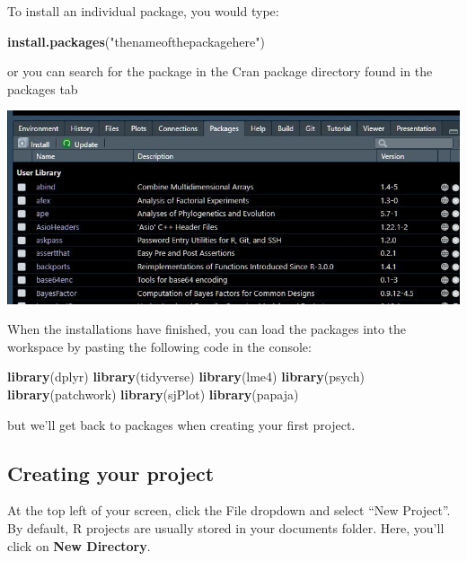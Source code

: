 \documentclass[
]{html}
\newenvironment{Shaded}{\begin{snugshade}}{\end{snugshade}}
\newcommand{\FunctionTok}[1]{\textcolor[rgb]{0.13,0.29,0.53}{\textbf{#1}}}
\newcommand{\NormalTok}[1]{#1}
\newcommand{\StringTok}[1]{\textcolor[rgb]{0.31,0.60,0.02}{#1}}
\theoremstyle{definition}
\theoremstyle{definition}
\theoremstyle{definition}
\theoremstyle{definition}
\theoremstyle{remark}
\begin{document}
To install an individual package, you would type:

\begin{Shaded}
\begin{Highlighting}[]
\FunctionTok{install.packages}\NormalTok{(}\StringTok{"thenameofthepackagehere"}\NormalTok{)}
\end{Highlighting}
\end{Shaded}

or you can search for the package in the Cran package directory found in the packages tab

\includegraphics{images/install.JPG}

When the installations have finished, you can load the packages into the workspace by pasting the following code in the console:

\begin{Shaded}
\begin{Highlighting}[]
\FunctionTok{library}\NormalTok{(dplyr)}
\FunctionTok{library}\NormalTok{(tidyverse)}
\FunctionTok{library}\NormalTok{(lme4)}
\FunctionTok{library}\NormalTok{(psych)}
\FunctionTok{library}\NormalTok{(patchwork)}
\FunctionTok{library}\NormalTok{(sjPlot)}
\FunctionTok{library}\NormalTok{(papaja)}
\end{Highlighting}
\end{Shaded}

but we'll get back to packages when creating your first project.

\hypertarget{creating-your-project}{%
\subsection{Creating your project}\label{creating-your-project}}

At the top left of your screen, click the File dropdown and select ``New Project''. By default, R projects are usually stored in your documents folder. Here, you'll click on \textbf{New Directory}.
\end{document}
